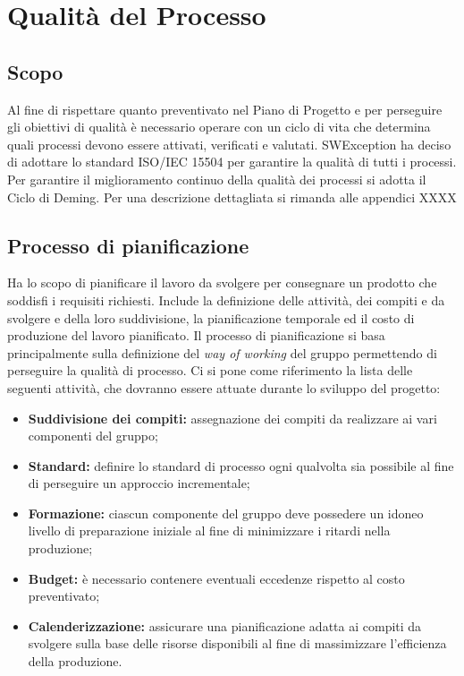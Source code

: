 \section{Qualità del Processo}
\subsection{Scopo}
Al fine di rispettare quanto preventivato nel Piano di Progetto e per perseguire gli obiettivi di qualità è necessario operare con un ciclo di vita che determina quali processi
devono essere attivati, verificati e valutati. SWException ha deciso di adottare lo standard ISO/IEC 15504 per garantire la qualità di tutti i processi.
Per garantire il miglioramento continuo della qualità dei processi si adotta il Ciclo di Deming. Per una descrizione dettagliata si rimanda alle appendici XXXX


\subsection{Processo di pianificazione}
Ha lo scopo di pianificare il lavoro da svolgere per consegnare un prodotto che soddisfi i requisiti richiesti. Include la definizione delle attività, dei compiti e da svolgere 
e della loro suddivisione, la pianificazione temporale ed il costo di produzione del lavoro pianificato.
Il processo di pianificazione si basa principalmente sulla definizione del \textit{way of working} del gruppo permettendo di perseguire la qualità di processo.
Ci si pone come riferimento la lista delle seguenti attività, che dovranno essere attuate durante lo sviluppo del progetto:

\begin{itemize}
    \item \textbf{Suddivisione dei compiti:} assegnazione dei compiti da realizzare ai vari componenti del gruppo;
    \item \textbf{Standard:} definire lo standard di processo ogni qualvolta sia possibile al fine di perseguire un approccio incrementale;
    \item \textbf{Formazione:} ciascun componente del gruppo deve possedere un idoneo  livello di preparazione iniziale al fine di minimizzare i ritardi nella produzione;
    \item \textbf{Budget:} è necessario contenere eventuali eccedenze rispetto al costo preventivato;
    \item \textbf{Calenderizzazione:} assicurare una pianificazione adatta ai compiti da svolgere sulla base delle risorse disponibili al fine di massimizzare l'efficienza della produzione.
\end{itemize}

